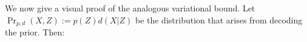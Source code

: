 \documentclass[twoside]{article}
\makeatletter
\theoremstyle{plain}
\theoremstyle{definition}
\newcommand\aar{\@ifstar\aar@one@star\aar@plain}
\newcommand\aar@one@star{\@ifstar\aar@resize{\aar@plain*}}
\newcommand\aar@resize[1]{\sbox{\aar@content}{#1}\scaleleftright[3.8ex]
			{\Biggl\langle\!\!\!\!\Biggl\langle}{\usebox{\aar@content}}
			{\Biggr\rangle\!\!\!\!\Biggr\rangle}}
\makeatother
\begin{document}
%
We now give a visual proof of the analogous variational bound.
Let $\Pr_{p,d}(X,Z) := p(Z)d(X|Z)$ be
the distribution that arises from decoding the prior. Then:
\end{document}
